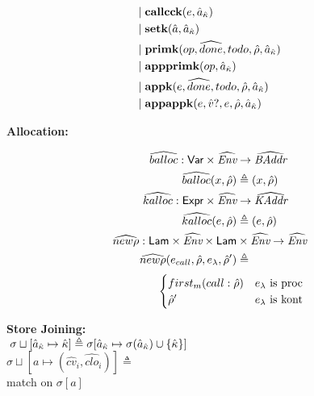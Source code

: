 \documentclass[12pt,draft]{article}
\newcommand{\store}[0]{\sigma}
\begin{document}
\begin{multicols*}{2}
\begin{align*}
    &|\; \textbf{callcck}(e, \hat{a}_{\hat{\kappa}}) \\
    &|\; \textbf{setk}(\hat{a}, \hat{a}_{\hat{\kappa}}) \\
    &|\; \textbf{primk}(op, \widehat{done}, todo, \hat{\rho}, \hat{a}_{\hat{\kappa}}) \\
    &|\; \textbf{appprimk}(op, \hat{a}_{\hat{\kappa}}) \\
    &|\; \textbf{appk}(e, \widehat{done}, todo, \hat{\rho}, \hat{a}_{\hat{\kappa}}) \\
    &|\; \textbf{appappk}(e, \hat{v}?, e, \hat{\rho}, \hat{a}_{\hat{\kappa}}) \\
  \end{align*}
  \begin{center}
    \textbf{Allocation:}
  \end{center}
  \vspace{-7mm}
  \begin{align*}
    \widehat{balloc}:\textsf{Var} \times \widehat{\textit{Env}} &\rightarrow \widehat{\textit{BAddr}} \\
    \widehat{balloc}(x, \hat{\rho}) &\triangleq (x, \hat{\rho}) \\
    \widehat{kalloc}:\textsf{Expr} \times \widehat{\textit{Env}} &\rightarrow \widehat{\textit{KAddr}} \\
    \widehat{kalloc}(e, \hat{\rho}) &\triangleq (e, \hat{\rho}) \\
    \widehat{new\rho}:\textsf{Lam} \times \widehat{\textit{Env}}
    \times \textsf{Lam} &\times \widehat{\textit{Env}}
                          \rightarrow \widehat{\textit{Env}} \\
    \widehat{new\rho}(e_{call} , \hat{\rho} , e_{\lambda} , \hat{\rho}') &\triangleq
  \end{align*}
  \vspace{-6mm}
  \[
    \;\;\;\;\;\;\;\;\;\;\;\;\;\;\begin{cases}
      first_m(call:\hat{\rho}) & e_{\lambda}\text{ is proc}\\
      \hat{\rho}' & e_{\lambda}\text{ is kont}
    \end{cases}
  \]
  \begin{center}
    \textbf{Store Joining:} \\
    $\;\store \sqcup [\akaddr \mapsto \akont]
    \triangleq \store[\akaddr \mapsto \store(\akaddr) \cup \{\akont\}]$ \\
    $\store \sqcup [a \mapsto (\hat{cv}_i, \widehat{clo}_i)] \triangleq$ \\
    match on $\store[a]$
  \end{center}

\end{multicols*}
\end{document}
